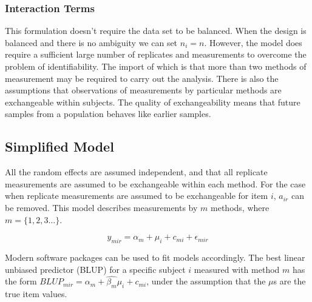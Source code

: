 \documentclass[12pt, a4paper]{report}
\theoremstyle{plain}
\theoremstyle{definition}
\theoremstyle{remark}
\begin{document}
\subsubsection*{Interaction Terms}


This formulation doesn't require the data set to be balanced. When the design is balanced and there is no ambiguity we can set $n_i=n$. However, the model does require a sufficient large number of replicates and measurements to overcome the problem of identifiability. The import of which is that more than two methods of measurement may be required to carry out the analysis. There is also the assumptions that observations of measurements by particular methods are exchangeable within subjects. The quality of exchangeability means that future samples from a population behaves like earlier samples.
	


\subsection*{Simplified Model}
All the random effects are assumed independent, and that all replicate measurements are assumed to be exchangeable within each method. For the case when replicate measurements are assumed to be exchangeable for item $i$, $a_{ir}$ can be removed. This model describes measurements by $m$ methods, where $m = \{1,2,3\ldots\}$.

\begin{equation}
y_{mir}  = \alpha_{m} + \mu_{i} + c_{mi} + \epsilon_{mir}
\end{equation}		

Modern software packages can be used to fit models accordingly. The best linear unbiased predictor (BLUP) for a specific subject $i$ measured with method $m$ has the form $BLUP_{mir} = \hat{\alpha_{m}} +
	\hat{\beta_{m}}\mu_{i} + c_{mi}$, under the assumption that the
	$\mu$s are the true item values.
	
\end{document}
